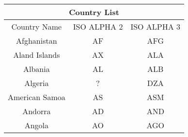\documentclass{article}
\begin{document}
\begin{center}
\begin{tabular}{|c|c|c|}
\hline
\multicolumn{3}{|c|}{Country List} \\
\hline
Country Name & ISO ALPHA 2 & ISO ALPHA 3 \\
\hline
Afghanistan & AF & AFG \\
Aland Islands & AX & ALA \\
Albania & AL & ALB \\
Algeria & ? & DZA \\ %
American Samoa & AS & ASM \\
Andorra & AD & AND \\
Angola & AO & AGO \\
\hline
\end{tabular}
\end{center}
\end{document}
